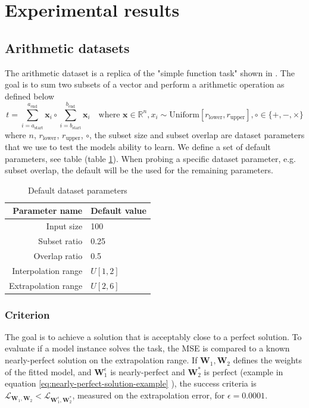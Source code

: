 \section{Experimental results}
\label{sec:experiments}

\subsection{Arithmetic datasets}

The arithmetic dataset is a replica of the "simple function task" shown in \cite{trask-nalu}.
The goal is to sum two subsets of a vector and perform a arithmetic operation as defined below
\begin{equation}
t = \sum_{i = a_{\mathrm{start}}}^{a_{\mathrm{end}}} \mathbf{x}_i \circ \sum_{i = b_{\mathrm{start}}}^{b_{\mathrm{end}}} \mathbf{x}_i \quad \text{where } \mathbf{x} \in \mathbb{R}^n, x_i \sim \mathrm{Uniform}[r_{\mathrm{lower}}, r_{\mathrm{upper}}], \circ \in \{+, -, \times\}
\label{eq:arithmetic-problem}
\end{equation}
where $n$, $r_{\mathrm{lower}}$, $r_{\mathrm{upper}}$, $\circ$, the subset size and subset overlap are dataset parameters that we use to test the models ability to learn.
We define a set of default parameters, see table (table \ref{tab:simple-function-task-defaults}).
When probing a specific dataset parameter, e.g. subset overlap, the default will be the used for the remaining parameters.
\begin{table}[h]
\caption{Default dataset parameters}
\label{tab:simple-function-task-defaults}
\centering
\begin{tabular}{r l}
\toprule
 Parameter name & Default value \\
 \midrule
 Input size & 100 \\
 Subset ratio & 0.25 \\
 Overlap ratio & 0.5 \\
 Interpolation range & $U[1,2]$ \\
 Extrapolation range & $U[2,6]$ \\
 \bottomrule
\end{tabular}
\end{table}

\subsubsection{Criterion}

The goal is to achieve a solution that is acceptably close to a perfect solution. To evaluate if a model instance solves the task, the MSE is compared to a known nearly-perfect solution on the extrapolation range. If $\mathbf{W}_1, \mathbf{W}_2$ defines the weights of the fitted model, and $\mathbf{W}_1^\epsilon$ is nearly-perfect and $\mathbf{W}_2^*$ is perfect (example in equation \ref{eq:nearly-perfect-solution-example} ), the success criteria is $\mathcal{L}_{\mathbf{W}_1, \mathbf{W}_2} < \mathcal{L}_{\mathbf{W}_1^\epsilon, \mathbf{W}_2^*}$, measured on the extrapolation error, for $\epsilon = 0.0001$.

